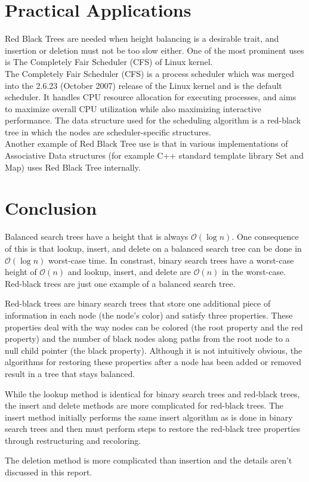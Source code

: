 \documentclass{article}[10pt]
\begin{document}
\section{Practical Applications}
Red Black Trees are needed when height balancing is a desirable trait, and insertion or deletion must not be too slow either. One of the most prominent uses is The Completely Fair Scheduler (CFS) of Linux kernel.\\
The Completely Fair Scheduler (CFS) is a process scheduler which was merged into the 2.6.23 (October 2007) release of the Linux kernel and is the default scheduler. It handles CPU resource allocation for executing processes, and aims to maximize overall CPU utilization while also maximizing interactive performance. The data structure used for the scheduling algorithm is a red-black tree in which the nodes are scheduler-specific structures.\\
Another example of Red Black Tree use is that in various implementations of Associative Data structures (for example C++ standard template library Set and Map) uses Red Black Tree internally.


\section{Conclusion}

Balanced search trees have a height that is always $\mathcal{O}(\log n)$. One consequence of this is that lookup, insert, and delete on a balanced search tree can be done in $\mathcal{O}(\log n)$ worst-case time. In constrast, binary search trees have a worst-case height of $\mathcal{O}(n)$ and lookup, insert, and delete are $\mathcal{O}(n)$ in the worst-case. Red-black trees are just one example of a balanced search tree.

Red-black trees are binary search trees that store one additional piece of information in each node (the node's color) and satisfy three properties. These properties deal with the way nodes can be colored (the root property and the red property) and the number of black nodes along paths from the root node to a null child pointer (the black property). Although it is not intuitively obvious, the algorithms for restoring these properties after a node has been added or removed result in a tree that stays balanced.

While the lookup method is identical for binary search trees and red-black trees, the insert and delete methods are more complicated for red-black trees. The insert method initially performs the same insert algorithm as is done in binary search trees and then must perform steps to restore the red-black tree properties through restructuring and recoloring. 

The deletion method is more complicated than insertion and the details aren't discussed in this report.
\end{document}
